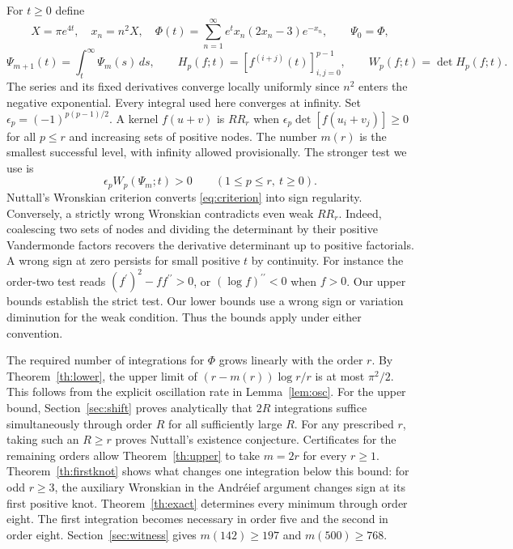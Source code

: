 \documentclass[11pt,a4paper,reqno]{amsart}
\numberwithin{equation}{section}
\begin{document}
For \(t\ge0\) define \[X=\pi e^{4t},\quad x_n=n^2X,\quad \Phi(t)=\sum_{n=1}^{\infty}e^t x_n(2x_n-3)e^{-x_n},\qquad \Psi_0=\Phi,\] \[\Psi_{m+1}(t)=\int_t^\infty\Psi_m(s)\,ds,\qquad
H_p(f;t)=[f^{(i+j)}(t)]_{i,j=0}^{p-1},\qquad W_p(f;t)=\det H_p(f;t).\] The series and its fixed derivatives converge locally uniformly since \(n^2\) enters the negative exponential. Every integral used here converges at infinity. Set \(\epsilon_p=(-1)^{p(p-1)/2}\). A kernel \(f(u+v)\) is \(RR_r\) when \(\epsilon_p\det[f(u_i+v_j)]\ge0\) for all \(p\le r\) and increasing sets of positive nodes. The number \(m(r)\) is the smallest successful level, with infinity allowed provisionally. The stronger test we use is 
\begin{equation}\label{eq:criterion}
\epsilon_p W_p(\Psi_m;t)>0 \qquad(1\le p\le r,\ t\ge0).
\end{equation}
 Nuttall's Wronskian criterion \cite[Lemma 2.1]{nuttall} converts \eqref{eq:criterion} into sign regularity. Conversely, a strictly wrong Wronskian contradicts even weak \(RR_r\). Indeed, coalescing two sets of nodes and dividing the determinant by their positive Vandermonde factors recovers the derivative determinant up to positive factorials. A wrong sign at zero persists for small positive \(t\) by continuity. For instance the order-two test reads \((f^{\prime})^2-ff^{\prime\prime}>0\), or \((\log f)^{\prime\prime}<0\) when \(f>0\). Our upper bounds establish the strict test. Our lower bounds use a wrong sign or variation diminution for the weak condition. Thus the bounds apply under either convention.

The required number of integrations for \(\Phi\) grows linearly with the order \(r\). By Theorem~\ref{th:lower}, the upper limit of \((r-m(r))\log r/r\) is at most \(\pi^2/2\). This follows from the explicit oscillation rate in Lemma~\ref{lem:osc}. For the upper bound, Section~\ref{sec:shift} proves analytically that \(2R\) integrations suffice simultaneously through order \(R\) for all sufficiently large \(R\). For any prescribed \(r\), taking such an \(R\ge r\) proves Nuttall's existence conjecture. Certificates for the remaining orders allow Theorem~\ref{th:upper} to take \(m=2r\) for every \(r\ge1\). Theorem~\ref{th:firstknot} shows what changes one integration below this bound: for odd \(r\ge3\), the auxiliary Wronskian in the Andréief argument changes sign at its first positive knot. Theorem~\ref{th:exact} determines every minimum through order eight. The first integration becomes necessary in order five and the second in order eight. Section~\ref{sec:witness} gives \(m(142)\ge197\) and \(m(500)\ge768\).
\end{document}
